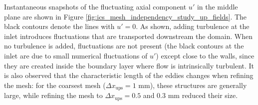 Instantaneous snapshots of the fluctuating axial component $u'$ in the middle plane are shown in Figure \ref{fig:ics_mesh_independency_study_up_fields}. The black contours denote the lines with $u' = 0$. As shown, adding turbulence at the inlet introduces fluctuations that are transported downstream the domain. When no turbulence is added, fluctuations are not present (the black contours at the inlet are due to small numerical fluctuations of $u'$) except close to the walls, since they are created inside the boundary layer where flow is intrinsically turbulent. It is also observed that the characteristic length of the eddies changes when refining the mesh: for the coarsest mesh ($\Delta x_\mathrm{ups} = 1$ mm), these structures are generally large, while refining the mesh to $\Delta x_\mathrm{ups} = 0.5$ and $0.3$ mm reduced their size. 

%
%
%
%
%
%
%

